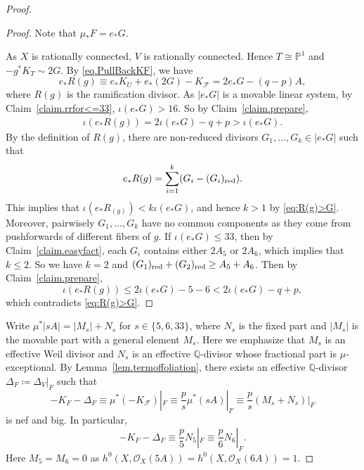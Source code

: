 \documentclass[12pt,twoside]{amsart}
\theoremstyle{definition}
\begin{document}
\begin{proof}
    \begin{proof}
        Note that $\mu_*F=e_*G$. 
        
        As $X$ is rationally connected, $V$ is rationally connected. Hence $T\cong\mathbb{P}^1$ and $-g^*K_T\sim 2G$. By \eqref{eq.PullBackKF}, we have
        \begin{equation}\label{eq.eR}
            e_*R(g)\equiv e_*K_U+e_*(2G)-K_{\mathcal F}=2e_*G-(q-p)A,
        \end{equation}
        where $R(g)$ is the ramification divisor. As $|e_*G|$ is a movable linear system, by Claim~\ref{claim.rrfor<=33}, $\iota(e_*G)>16$.  So by Claim~\ref{claim.prepare}, 
        \begin{align}
            \iota(e_*R(g))=2\iota(e_*G)-q+p>\iota(e_*G). \label{eq:R(g)>G}
        \end{align}
        By the definition of $R(g)$, there are non-reduced divisors $G_1,\dots, G_k\in |e_*G|$ such that
        \[
            e_*R(g)=\sum_{i=1}^k(G_i-(G_i)_{\text{\rm red}}).
        \]
        This implies that $\iota(e_*R_(g))<k\iota(e_*G)$, and hence $k>1$ by \eqref{eq:R(g)>G}. Moreover, pairwisely $G_1, \dots, G_k$ have no common components as they come from pushforwards of different fibers of $g$. If $\iota(e_*G)\leq 33$, then by Claim~\ref{claim.easyfact}, each $G_i$ contains either $2A_5$ or $2A_6$, which implies that $k\leq 2$. So we have $k=2$ and $(G_1)_{\text{\rm red}}+(G_2)_{\text{\rm red}}\geq A_5+A_6$. Then by Claim~\ref{claim.prepare},
        \[
            \iota(e_*R(g))\leq 2\iota(e_*G)-5-6<2\iota(e_*G)-q+p,
        \]
        which contradicts \eqref{eq:R(g)>G}.
    \end{proof}

    Write $\mu^*|sA|=|M_{s}|+N_{s}$ for $s\in \{5,6,33\}$, where $N_s$ is the fixed part and $|M_{s}|$ is the movable part with a general element $M_s$. Here we emphasize that $M_s$ is an effective Weil divisor and $N_s$ is an effective $\mathbb{Q}$-divisor whose fractional part is $\mu$-exceptional. By Lemma~\ref{lem.termoffoliation}, there exists an effective $\mathbb{Q}$-divisor $\Delta_F\coloneq \Delta_V|_F$ such that 
    \begin{equation}\label{eq.linearity}
        -K_F-\Delta_F\equiv \mu^*(-K_\mathcal{F})|_F\equiv\frac{p}{s}\mu^*(sA)|_F\equiv\frac{p}{s}(M_s+N_s)|_F
    \end{equation}
    is nef and big. In particular,
    \[
        -K_F-\Delta_F \equiv\frac{p}{5}N_{5}|_F\equiv \frac{p}{6}N_{6}|_F.
    \]
    Here $M_5=M_6=0$ as $ h^0(X, \mathcal O_X(5A))=h^0(X, \mathcal O_X(6A))=1$.


\end{proof}
\end{document}
